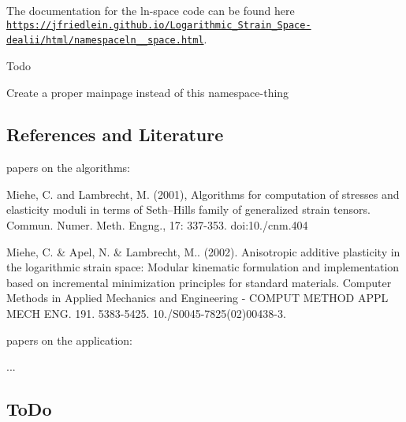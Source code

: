 The documentation for the ln-\/space code can be found here \href{https://jfriedlein.github.io/Logarithmic_Strain_Space-dealii/html/namespaceln__space.html}{\tt https\+://jfriedlein.\+github.\+io/\+Logarithmic\+\_\+\+Strain\+\_\+\+Space-\/dealii/html/namespaceln\+\_\+\+\_\+space.\+html}.

\begin{DoxyRefDesc}{Todo}
\item[\hyperlink{todo__todo000002}{Todo}]Create a proper mainpage instead of this namespace-\/thing\end{DoxyRefDesc}


\subsection*{References and Literature}


\begin{DoxyItemize}
\item papers on the algorithms\+:
\begin{DoxyItemize}
\item Miehe, C. and Lambrecht, M. (2001), Algorithms for computation of stresses and elasticity moduli in terms of Seth–\+Hill\textquotesingle{}s family of generalized strain tensors. Commun. Numer. Meth. Engng., 17\+: 337-\/353. doi\+:10./cnm.404
\item Miehe, C. \& Apel, N. \& Lambrecht, M.. (2002). Anisotropic additive plasticity in the logarithmic strain space\+: Modular kinematic formulation and implementation based on incremental minimization principles for standard materials. Computer Methods in Applied Mechanics and Engineering -\/ C\+O\+M\+P\+UT M\+E\+T\+H\+OD A\+P\+PL M\+E\+CH E\+NG. 191. 5383-\/5425. 10./\+S0045-\/7825(02)00438-\/3.
\end{DoxyItemize}
\item papers on the application\+:
\begin{DoxyItemize}
\item ...
\end{DoxyItemize}
\end{DoxyItemize}

\subsection*{To\+Do}


